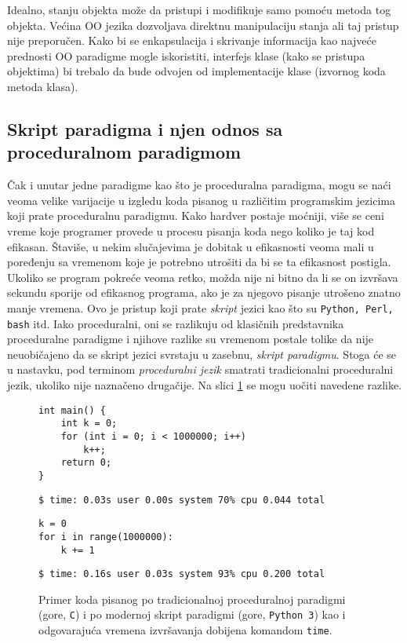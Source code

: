 Idealno, stanju objekta može da pristupi i modifikuje samo pomoću metoda tog objekta. Većina OO jezika dozvoljava direktnu manipulaciju stanja ali taj pristup nije preporučen. Kako bi se enkapsulacija i skrivanje informacija kao najveće prednosti OO paradigme mogle iskoristiti, interfejs klase (kako se pristupa objektima) bi trebalo da bude odvojen od implementacije klase (izvornog koda metoda klasa).


\subsection{Skript paradigma i njen odnos sa proceduralnom paradigmom}
\label{subsec:Languages}

Čak i unutar jedne paradigme kao što je proceduralna paradigma, mogu se naći veoma velike varijacije u izgledu koda pisanog u različitim programskim jezicima koji prate proceduralnu paradigmu. Kako hardver postaje moćniji, više se ceni vreme koje programer provede u procesu pisanja koda nego koliko je taj kod efikasan. Štaviše, u nekim slučajevima je dobitak u efikasnosti veoma mali u poređenju sa vremenom koje je potrebno utrošiti da bi se ta efikasnost postigla. Ukoliko se program pokreće veoma retko, možda nije ni bitno da li se on izvršava sekundu sporije od efikasnog programa, ako je za njegovo pisanje utrošeno znatno manje vremena. Ovo je pristup koji prate \emph{skript} jezici kao što su \texttt{Python, Perl, bash} itd. Iako proceduralni, oni se razlikuju od klasičnih predstavnika proceduralne paradigme i njihove razlike su vremenom postale tolike da nije neuobičajeno da se skript jezici svrstaju u zasebnu, \emph{skript paradigmu}. Stoga će se u nastavku, pod terminom \emph{proceduralni jezik} smatrati tradicionalni proceduralni jezik, ukoliko nije naznačeno drugačije. Na slici \ref{fig:LanguagesDiff} se mogu uočiti navedene razlike.

\begin{figure}[h!]
\begin{lstlisting}
int main() {
    int k = 0;
    for (int i = 0; i < 1000000; i++)
        k++;
    return 0;
}
\end{lstlisting}
\begin{lstlisting}[language={}]
$ time: 0.03s user 0.00s system 70% cpu 0.044 total
\end{lstlisting}
\begin{lstlisting}
k = 0
for i in range(1000000):
    k += 1
\end{lstlisting}
\begin{lstlisting}[language={}]
$ time: 0.16s user 0.03s system 93% cpu 0.200 total
\end{lstlisting}
\caption{Primer koda pisanog po tradicionalnoj proceduralnoj paradigmi (gore, \texttt{C}) i po modernoj skript paradigmi (gore, \texttt{Python 3}) kao i odgovarajuća vremena izvršavanja dobijena komandom \texttt{time}.}
\label{fig:LanguagesDiff}
\end{figure}

